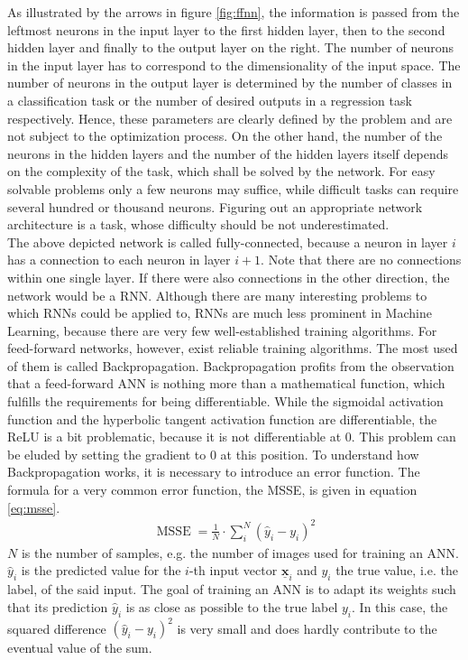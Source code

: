 \documentclass[11pt, a4paper]{article}
\newcommand\V[1]{\ensuremath{\underline{\mathbf{#1}}}}
\begin{document}
As illustrated by the arrows in figure \ref{fig:ffnn}, the information is passed from the leftmost neurons in the input layer to the first hidden layer, then to the second hidden layer and finally to the output layer on the right. The number of neurons in the input layer has to correspond to the dimensionality of the input space. The number of neurons in the output layer is determined by the number of classes in a classification task or the number of desired outputs in a regression task respectively. Hence, these parameters are clearly defined by the problem and are not subject to the optimization process. On the other hand, the number of the neurons in the hidden layers and the number of the hidden layers itself depends on the complexity of the task, which shall be solved by the network. For easy solvable problems only a few neurons may suffice, while difficult tasks can require several hundred or thousand neurons. Figuring out an appropriate network architecture is a task, whose difficulty should be not underestimated.\\
The above depicted network is called fully-connected, because a neuron in layer $i$ has a connection to each neuron in layer $i + 1$. Note that there are no connections within one single layer. If there were also connections in the other direction, the network would be a \ac{RNN}. Although there are many interesting problems to which \acp{RNN} could be applied to, \acp{RNN} are much less prominent in Machine Learning, because there are very few well-established training algorithms. For feed-forward networks, however, exist reliable training algorithms. The most used of them is called Backpropagation. Backpropagation profits from the observation that a feed-forward \ac{ANN} is nothing more than a mathematical function, which fulfills the requirements for being differentiable. While the sigmoidal activation function and the hyperbolic tangent activation function are differentiable, the \ac{ReLU} is a bit problematic, because it is not differentiable at $0$. This problem can be eluded by setting the gradient to $0$ at this position. To understand how Backpropagation works, it is necessary to introduce an error function. The formula for a very common error function, the \ac{MSSE}, is given in equation \eqref{eq:msse}.
\begin{align}
\label{eq:msse}
\operatorname{MSSE} = \frac{1}{N} \cdot \sum_{i}^{N} \left(\hat{y}_i - y_i\right)^2
\end{align}
$N$ is the number of samples, e.g. the number of images used for training an \ac{ANN}. $\hat{y}_i$ is the predicted value for the $i$-th input vector $\V{x}_i$ and $y_i$ the true value, i.e. the label, of the said input. The goal of training an \ac{ANN} is to adapt its weights such that its prediction $\hat{y}_i$ is as close as possible to the true label $y_i$. In this case, the squared difference $(\hat{y}_i - y_i)^2$ is very small and does hardly contribute to the eventual value of the sum.\\
\end{document}

